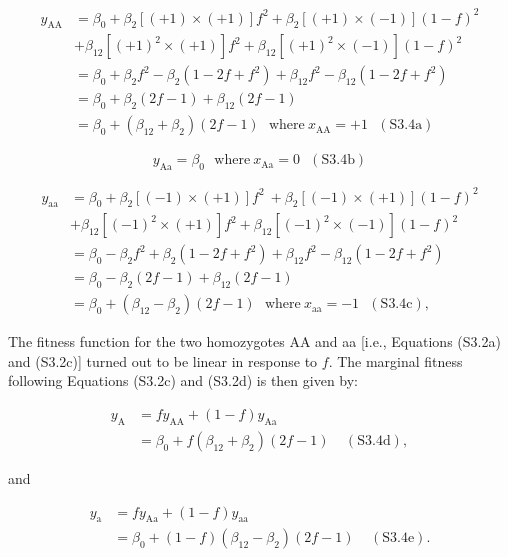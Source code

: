 \documentclass[12pt,]{article}
\begin{document}
\begin{equation*}
\begin{split}
y_\mathrm{AA} &= \beta_0 + \beta_2 [(+1)\times(+1)] f^2 + \beta_2 [(+1)\times(-1)] (1-f)^2 \\
& + \beta_{12} [(+1)^2\times(+1)] f^2 + \beta_{12} [(+1)^2\times(-1)] (1-f)^2 \\ 
&= \beta_0 + \beta_2f^2 - \beta_2(1-2f+f^2) + \beta_{12}f^2 - \beta_{12}(1-2f+f^2) \\
&= \beta_0 + \beta_2(2f - 1) + \beta_{12}(2f-1) \\ 
&= \beta_0 + (\beta_{12}+\beta_2)(2f-1)~~~\mathrm{where}~x_\mathrm{AA} = +1~~~(\mathrm{S3.4a})
\end{split}
\end{equation*}

$$y_\mathrm{Aa} = \beta_0~~~\mathrm{where}~x_\mathrm{Aa} = 0~~~(\mathrm{S3.4b})$$

\begin{equation*}
\begin{split}
y_\mathrm{aa} &= \beta_0 + \beta_2 [(-1)\times(+1)] f^2\ + \beta_2 [(-1)\times(+1)] (1-f)^2 \\
& + \beta_{12} [(-1)^2\times(+1)] f^2 + \beta_{12} [(-1)^2\times(-1)] (1-f)^2 \\
&= \beta_0 - \beta_2f^2 + \beta_2(1-2f+f^2) + \beta_{12}f^2 - \beta_{12}(1-2f+f^2) \\
&= \beta_0 - \beta_2(2f - 1) + \beta_{12}(2f-1) \\
&= \beta_0 + (\beta_{12} - \beta_2)(2f - 1)~~~\mathrm{where}~x_\mathrm{aa} = -1~~~(\mathrm{S3.4c}),
\end{split}
\end{equation*}

\noindent
The fitness function for the two homozygotes AA and aa [i.e., Equations (S3.2a) and (S3.2c)] turned out to be linear in response to $f$. The marginal fitness following Equations (S3.2c) and (S3.2d) is then given by:

\begin{equation*}
\begin{split}
y_\mathrm{A} &= fy_\mathrm{AA} + (1-f)y_\mathrm{Aa}\\
&= \beta_0+f(\beta_{12}+\beta_2)(2f-1)~~~~~(\mathrm{S3.4d}),
\end{split}
\end{equation*}

\noindent
and

\begin{equation*}
\begin{split}
y_\mathrm{a} &= fy_\mathrm{Aa} + (1-f)y_\mathrm{aa}\\
&= \beta_0+(1-f)(\beta_{12}-\beta_2)(2f-1)~~~~~(\mathrm{S3.4e}).
\end{split}
\end{equation*}
\end{document}
